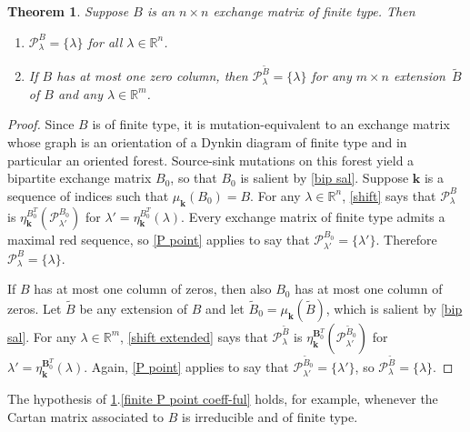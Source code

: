\documentclass{amsart}
\newtheorem{theorem}[proposition]{Theorem}
\theoremstyle{definition}
\theoremstyle{remark}
\numberwithin{equation}{section}
\newcommand{\reals}{\mathbb R}
\newcommand{\set}[1]{{\lbrace #1 \rbrace}}
\newcommand{\0}{{\mathbf{0}}}
\newcommand{\kk}{\mathbf{k}}
\newcommand{\tB}{{\tilde{B}}}
\newcommand{\BB}{\mathbf{B}}
\renewcommand{\P}{\mathcal{P}}
\begin{document}
\begin{theorem}\label{finite P point}  
Suppose $B$ is an $n\times n$ exchange matrix of finite type.
Then 
\begin{enumerate}[\quad\bf1.]
\item \label{finite P point coeff-free}
$\P^B_\lambda=\set{\lambda}$ for all $\lambda\in\reals^n$.
\item \label{finite P point coeff-ful}
If $B$ has at most one zero column, then $\P^\tB_\lambda=\set{\lambda}$ for any $m\times n$ extension~$\tB$ of $B$ and any $\lambda\in\reals^m$.
\end{enumerate}
\end{theorem}
\begin{proof}
Since $B$ is of finite type, it is mutation-equivalent to an exchange matrix whose graph is an orientation of a Dynkin diagram of finite type and in particular an oriented forest.
Source-sink mutations on this forest yield a bipartite exchange matrix $B_0$, so that $B_0$ is salient by \cref{bip sal}.
Suppose $\kk$ is a sequence of indices such that $\mu_\kk(B_0)=B$.
For any $\lambda\in\reals^n$, \cref{shift} says that $\P_\lambda^B$ is $\eta_\kk^{B_0^T}(\P_{\lambda'}^{B_0})$ for $\lambda'=\eta_\kk^{B_0^T}(\lambda)$.
Every exchange matrix of finite type admits a maximal red sequence, so \cref{P point} applies to say that $\P_{\lambda'}^{B_0}=\set{\lambda'}$.
Therefore $\P_\lambda^B=\set{\lambda}$.

If $B$ has at most one column of zeros, then also $B_0$ has at most one column of zeros.
Let $\tB$ be any extension of $B$ and let $\tB_0=\mu_\kk(\tB)$, which is salient by \cref{bip sal}.
For any $\lambda\in\reals^m$, \cref{shift extended} says that $\P_\lambda^\tB$ is $\eta_\kk^{\BB_0^T}(\P_{\lambda'}^{\tB_0})$ for $\lambda'=\eta_\kk^{\BB_0^T}(\lambda)$.
Again, \cref{P point} applies to say that $\P_{\lambda'}^{\tB_0}=\set{\lambda'}$, so $\P_\lambda^\tB=\set{\lambda}$.
\end{proof}

The hypothesis of \cref{finite P point}.\ref{finite P point coeff-ful} holds, for example, whenever the Cartan matrix associated to $B$ is irreducible and of finite type.
\end{document}
